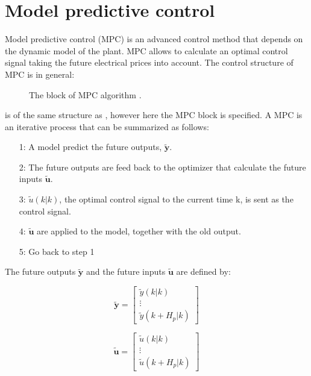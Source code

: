 \section{Model predictive control}
\label{sec:MPC}

Model predictive control (MPC) is an advanced control method that depends on the dynamic model of the plant. MPC allows to calculate an optimal control signal taking the future electrical prices into account. The control structure of MPC is in general:

\begin{figure}[H]
\centering
 
\caption{The block of MPC algorithm \cite{Camacho2007}.}
\label{mpc_structure}
\end{figure}

 is of the same structure as , however here the MPC block is specified. A MPC is an iterative process that can be summarized as follows: 

\begin{itemize}
\item[1:] A model predict the future outputs, $\bm{\tilde y}$.
\item[2:] The future outputs are feed back to the optimizer that calculate the future inputs $\bm{\tilde u}$.
\item[3:] $\tilde u(k|k)$, the optimal control signal to the current time k, is sent as the control signal.
\item[4:] $\bm{\tilde u}$ are applied to the model, together with the old output.
\item[5:] Go back to step 1 
\end{itemize}

The future outputs $\bm{\tilde y}$ and the future inputs $\bm{\tilde u}$ are defined by:

\begin{equation}
\bm{\tilde y} =  
 \begin{bmatrix}
  \tilde y(k|k)\\
  \vdots  \\
  \tilde y(k+H_p|k)   
 \end{bmatrix}
\end{equation}

\begin{equation}
\bm{\tilde u} =  
 \begin{bmatrix}
  \tilde u(k|k)\\
  \vdots  \\
  \tilde u(k+H_p|k)   
 \end{bmatrix}
\end{equation}

